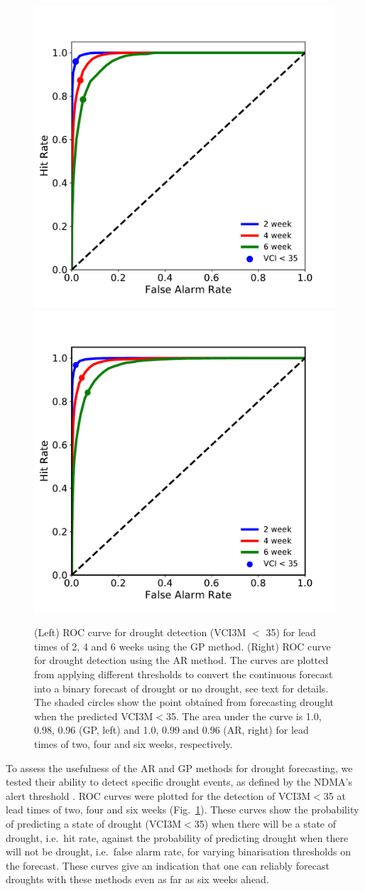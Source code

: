\documentclass[review]{elsarticle}
\begin{document}
\begin{figure}%
	\centering
	\includegraphics[trim = 20mm 4mm 12mm 3mm,width=5.6 cm]{figures/VCIfcO.pdf}
	\qquad
	\includegraphics[trim = 12mm 4mm 20mm 3mm,width=5.6 cm]{figures/VCIfc0abb2.pdf}
	\caption{(Left) ROC curve for drought detection (VCI3M $<$ 35) for lead times of 2, 4 and 6 weeks using the GP method. (Right) ROC curve for drought detection using the AR method. The curves are plotted from applying different thresholds to convert the continuous forecast into a binary forecast of drought or no drought, see text for details. The shaded circles show the point obtained from forecasting drought when the predicted VCI3M$<$35. The area under the curve is 1.0, 0.98, 0.96 (GP, left) and 1.0, 0.99 and 0.96 (AR, right) for lead times of two, four and six weeks, respectively. }
	\label{fig:ROC_abb}
\end{figure}





To assess the usefulness of the AR and GP methods for drought forecasting, we tested their ability to detect specific drought events, as defined by the NDMA's alert threshold \citep[VCI3M$<$35,][]{rs8040267}. ROC curves were plotted for the detection of VCI3M$<$35 at lead times of two, four and six weeks (Fig.~\ref{fig:ROC_abb}). These curves show the probability of predicting a state of drought (VCI3M$<$35) when there will be a state of drought, i.e.~hit rate, against the probability of predicting drought when there will not be drought, i.e.~false alarm rate, for varying binarisation thresholds on the forecast. These curves give an indication that one can {\color{green} reliably} forecast droughts with these methods even as far as six weeks ahead. 
\end{document}

